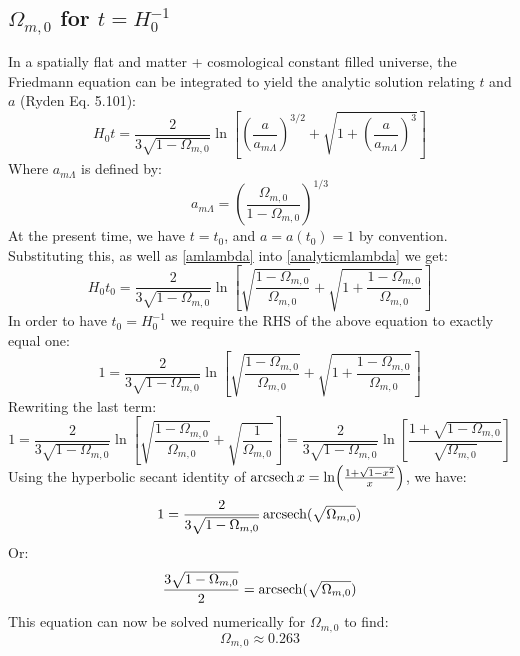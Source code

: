 \subsection{$\Omega_{m, 0}$ for $t = H_0^{-1}$}
In a spatially flat and matter + cosmological constant filled universe, the Friedmann equation can be integrated to yield the analytic solution relating $t$ and $a$ (Ryden Eq. 5.101):
\begin{equation}\label{analyticmlambda}
    H_0t = \frac{2}{3\sqrt{1 - \Omega_{m, 0}}}\ln\left[\left(\frac{a}{a_{m\Lambda}}\right)^{3/2} + \sqrt{1 + \left(\frac{a}{a_{m\Lambda}}\right)^3}\right]
\end{equation}
Where $a_{m\Lambda}$ is defined by:
\begin{equation}\label{amlambda}
    a_{m\Lambda} = \left(\frac{\Omega_{m,0}}{1 - \Omega_{m, 0}}\right)^{1/3}
\end{equation}
At the present time, we have $t = t_0$, and $a = a(t_0) = 1$ by convention. Substituting this, as well as \eqref{amlambda} into \eqref{analyticmlambda} we get:
\begin{equation}
    H_0t_0 = \frac{2}{3\sqrt{1 - \Omega_{m, 0}}}\ln\left[\sqrt{\frac{1-\Omega_{m, 0}}{\Omega_{m, 0}}} + \sqrt{1 + \frac{1-\Omega_{m, 0}}{\Omega_{m, 0}}}\right]
\end{equation}
In order to have $t_0 = H_0^{-1}$ we require the RHS of the above equation to exactly equal one:
\begin{equation}
    1 = \frac{2}{3\sqrt{1 - \Omega_{m, 0}}}\ln\left[\sqrt{\frac{1-\Omega_{m, 0}}{\Omega_{m, 0}}} + \sqrt{1 + \frac{1-\Omega_{m, 0}}{\Omega_{m, 0}}}\right]
\end{equation}
Rewriting the last term:
\begin{equation}
    1 = \frac{2}{3\sqrt{1 - \Omega_{m, 0}}}\ln\left[\sqrt{\frac{1-\Omega_{m, 0}}{\Omega_{m, 0}}} + \sqrt{\frac{1}{\Omega_{m, 0}}}\right] = \frac{2}{3\sqrt{1 - \Omega_{m, 0}}}\ln\left[\frac{1 + \sqrt{1 - \Omega_{m, 0}}}{\sqrt{\Omega_{m, 0}}}\right]
\end{equation}
Using the hyperbolic secant identity of $\operatorname{arcsech} x = \ln(\frac{1 + \sqrt{1 - x^2}}{x})$, we have:
\begin{equation}
    1 = \frac{2}{3\sqrt{1 - \Omega_{m, 0}}}\operatorname{arcsech}(\sqrt{\Omega_{m, 0}})
\end{equation}
Or:
\begin{equation}\label{59exp}
    \frac{3\sqrt{1 - \Omega_{m, 0}}}{2} = \operatorname{arcsech}(\sqrt{\Omega_{m, 0}})
\end{equation}
This equation can now be solved numerically for $\Omega_{m, 0}$ to find:
\begin{equation}
    \boxed{\Omega_{m, 0} \approx 0.263}
\end{equation}

